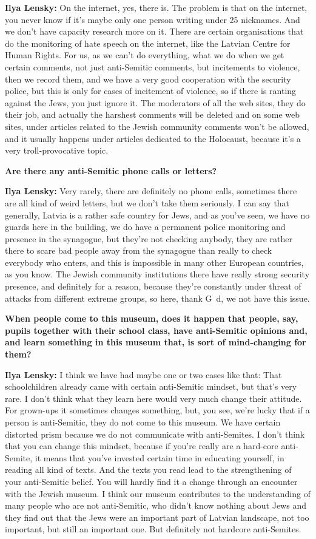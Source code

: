 \textbf{Ilya Lensky:} On the internet, yes, there is. The problem is that on the internet, you never know if it's maybe only one person writing under 25 nicknames. And we don’t have capacity research more on it. There are certain organisations that do the monitoring of hate speech on the internet, like the Latvian Centre for Human Rights. For us, as we can’t do everything, what we do when we get certain comments, not just anti-Semitic comments, but incitements to violence, then we record them, and we have a very good cooperation with the security police, but this is only for cases of incitement of violence, so if there is ranting against the Jews, you just ignore it. The moderators of all the web sites, they do their job, and actually the harshest comments will be deleted and on some web sites, under articles related to the Jewish community comments won't be allowed, and it usually happens under articles dedicated to the Holocaust, because it's a very troll-provocative topic.

\textbf{Are there any anti-Semitic phone calls or letters?} 

\textbf{Ilya Lensky:} Very rarely, there are definitely no phone calls, sometimes there are all kind of weird letters, but we don’t take them seriously. I can say that generally, Latvia is a rather safe country for Jews, and as you’ve seen, we have no guards here in the building, we do have a permanent police monitoring and presence in the synagogue, but they’re not checking anybody, they are rather there to scare bad people away from the synagogue than really to check everybody who enters, and this is impossible in many other European countries, as you know. The Jewish community institutions there have really strong security presence, and definitely for a reason, because they’re constantly under threat of attacks from different extreme groups, so here, thank G~d, we not have this issue.

\textbf{When people come to this museum, does it happen that people, say, pupils together with their school class, have anti-Semitic opinions and, and learn something in this museum that, is sort of mind-changing for them?} 

\textbf{Ilya Lensky:} I think we have had maybe one or two cases like that: That schoolchildren already came with certain anti-Semitic mindset, but that’s very rare. I don’t think what they learn here would very much change their attitude. For grown-ups it sometimes changes something, but, you see, we’re lucky that if a person is anti-Semitic, they do not come to this museum. We have certain distorted prism because we do not communicate with anti-Semites. 
I don’t think that you can change this mindset, because if you’re really are a hard-core anti-Semite, it means that you’ve invested certain time in educating yourself, in reading all kind of texts. And the texts you read lead to the strengthening of your anti-Semitic belief. You will hardly find it a change through an encounter with the Jewish museum. I think our museum contributes to the understanding of many people who are not anti-Semitic, who didn't know nothing about Jews and they find out that the Jews were an important part of Latvian landscape, not too important, but still an important one. But definitely not hardcore anti-Semites. 

